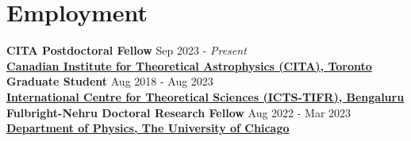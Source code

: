 		
		
		\section{Employment}
        \textbf{CITA Postdoctoral Fellow} \hfill Sep 2023 - \textit{Present}
		\\
            \vspace{0.4em}\textbf{\href{https://www.cita.utoronto.ca/}{Canadian Institute for Theoretical Astrophysics (CITA), Toronto}}\\
            \textbf{Graduate Student} \hfill Aug 2018 - Aug 2023
		\\
		\vspace{0.4em}\textbf{\href{https://www.icts.res.in/}{International Centre for Theoretical Sciences (ICTS-TIFR), Bengaluru}}\\
		\textbf{Fulbright-Nehru Doctoral Research Fellow } \hfill Aug 2022 - Mar 2023
		\\
		\textbf{\href{https://physics.uchicago.edu/}{Department of Physics, The University of Chicago}}
		
		
